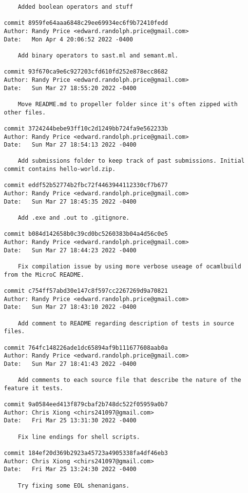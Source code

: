 {\begin{verbatim}
    Added boolean operators and stuff

commit 8959fe64aaa6848c29ee69934ec6f9b72410fedd
Author: Randy Price <edward.randolph.price@gmail.com>
Date:   Mon Apr 4 20:06:52 2022 -0400

    Add binary operators to sast.ml and semant.ml.

commit 93f670ca9e6c927203cfd610fd252e878ecc8682
Author: Randy Price <edward.randolph.price@gmail.com>
Date:   Sun Mar 27 18:55:20 2022 -0400

    Move README.md to propeller folder since it's often zipped with other files.

commit 3724244bebe93ff10c2d1249bb724fa9e562233b
Author: Randy Price <edward.randolph.price@gmail.com>
Date:   Sun Mar 27 18:54:13 2022 -0400

    Add submissions folder to keep track of past submissions. Initial commit contains hello-world.zip.

commit eddf52b52774b2fbc72f4463944112330cf7b677
Author: Randy Price <edward.randolph.price@gmail.com>
Date:   Sun Mar 27 18:45:35 2022 -0400

    Add .exe and .out to .gitignore.

commit b084d142658b0c39cd0bc5260383b04a4d56c0e5
Author: Randy Price <edward.randolph.price@gmail.com>
Date:   Sun Mar 27 18:44:23 2022 -0400

    Fix compilation issue by using more verbose useage of ocamlbuild from the MicroC README.

commit c754ff57abd30e147c8f597cc2267269d9a70821
Author: Randy Price <edward.randolph.price@gmail.com>
Date:   Sun Mar 27 18:43:10 2022 -0400

    Add comment to README regarding description of tests in source files.

commit 764fc148226ade1dc65894af9b111677608aab0a
Author: Randy Price <edward.randolph.price@gmail.com>
Date:   Sun Mar 27 18:41:43 2022 -0400

    Add comments to each source file that describe the nature of the feature it tests.

commit 9a0584eed413f879cbaf2b748dc522f05959a0b7
Author: Chris Xiong <chirs241097@gmail.com>
Date:   Fri Mar 25 13:31:30 2022 -0400

    Fix line endings for shell scripts.

commit 184ef20d369b2923a45723a4905338fa4df46eb3
Author: Chris Xiong <chirs241097@gmail.com>
Date:   Fri Mar 25 13:24:30 2022 -0400

    Try fixing some EOL shenanigans.


\end{verbatim}}
